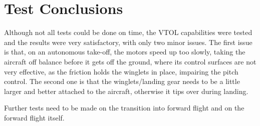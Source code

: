 \begin{table}[]
\centering

\caption{Loiter tests summary.}\label{table:loiter}
\end{table}


\section{Test Conclusions}

Although not all tests could be done on time, the VTOL capabilities were tested and the results were very satisfactory, with only two minor issues. The first issue is that, on an autonomous take-off, the motors speed up too slowly, taking the aircraft off balance before it gets off the ground, where its control surfaces are not very effective, as the friction holds the winglets in place, impairing the pitch control. The second one is that the winglets/landing gear needs to be a little larger and better attached to the aircraft, otherwise it tips over during landing.

Further tests need to be made on the transition into forward flight and on the forward flight itself.
